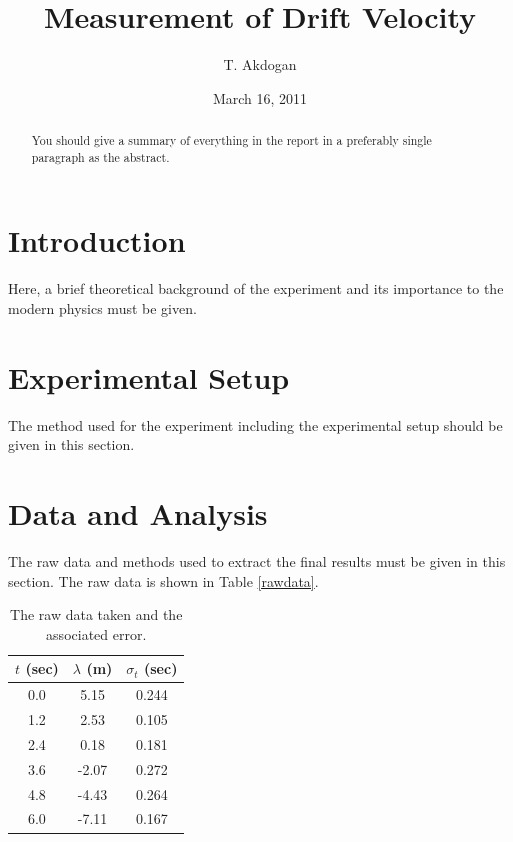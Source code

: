 \documentclass[aps,nofootinbib,onecolumn,groupedaddress,a4paper]{revtex4}
\begin{document}
\title{Measurement of Drift Velocity} 

\author{T. Akdogan}


\date{March 16, 2011}

\begin{abstract}
You should give a summary of everything in the report in a preferably single paragraph as the abstract.
\end{abstract}

\maketitle


\section{Introduction}
Here, a brief theoretical background of the experiment and its importance to the modern physics must be given.

\section{Experimental Setup}
The method used for the experiment including the experimental setup should be given in this section.

\section{Data and Analysis}
The raw data and methods used to extract the final results must be given in this section. The raw data is shown in Table \ref{rawdata}.
\begin{table}[htdp]
\caption{The raw data taken and the associated error.\label{rawdata}}
\centering
\begin{tabular}{ccc}
\\
$t$ (sec) & $\lambda$ (m) & $\sigma_t$ (sec) \\
\hline
0.0 &  5.15  &  0.244 \\
1.2 &  2.53  &  0.105 \\
2.4 &  0.18  &  0.181 \\
3.6 & -2.07  &  0.272 \\
4.8 & -4.43  &  0.264 \\
6.0 & -7.11  &  0.167 
\end{tabular}
\label{default}
\end{table}%
\end{document}
